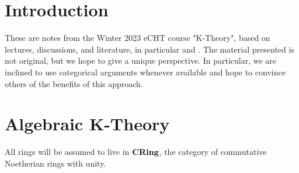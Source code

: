 \section{Introduction}
These are notes from the Winter 2023 eCHT course "K-Theory", based on lectures, discussions, and literature, in particular \cite{Dugger} and \cite{Hatcher-vec}. The material presented is not original, but we hope to give a unique perspective. In particular, we are inclined to use categorical arguments whenever available and hope to convince others of the benefits of this approach. 
\section{Algebraic K-Theory}
All rings will be assumed to live in ${\normalfont\textbf{CRing}}$, the category of commutative Noetherian rings with unity.

